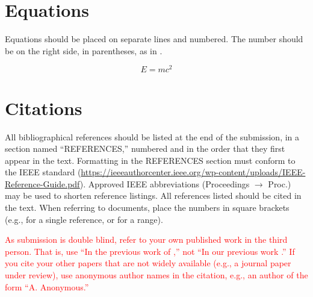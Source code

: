 \documentclass{article}
\begin{document}
\section{Equations}

Equations should be placed on separate lines and numbered.
The number should be on the right side, in parentheses, as in .

\begin{equation}\label{relativity}
E=mc^{2}
\end{equation}

\section{Citations}

All bibliographical references should be listed at the end of the submission, in a section named ``REFERENCES,''
numbered and in the order that they first appear in the text. Formatting in the REFERENCES section must conform to the
IEEE standard (\url{https://ieeeauthorcenter.ieee.org/wp-content/uploads/IEEE-Reference-Guide.pdf}). Approved
IEEE abbreviations (Proceedings $\rightarrow$ Proc.) may be used to shorten reference listings. All references listed
should be cited in the text. When referring to documents, place the numbers in square brackets (e.g., \cite{ISMIR17Author:01}
for a single reference, or \cite{JNMR10Someone:01,Book20Person:01,Chapter09Person:01} for a range).

\textcolor{red}{As submission is double blind, refer to your own published work in the third person. That is, use ``In the previous work of \cite{ISMIR17Author:01},'' not ``In our previous work \cite{ISMIR17Author:01}.'' If you cite your other papers that are not widely available (e.g., a journal paper under review), use anonymous author names in the citation, e.g., an author of the form ``A. Anonymous.''}



%
%
%
%
%
\end{document}
